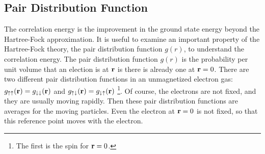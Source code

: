 \subsection{Pair Distribution Function}
The correlation energy is the improvement in the ground state energy beyond the Hartree-Fock approximation.
It is useful to examine an important property of the Hartree-Fock theory, the pair distribution function $g(r)$, to understand the correlation energy.
The pair distribution function $g(r)$ is the probability per unit volume that an election is at $\mathbf{r}$ is there is already one at $\mathbf{r}=0$.
There are two different pair distribution functions in an unmagnetized electron gas: $g_{\uparrow\uparrow}(\mathbf{r}) = g_{\downarrow\downarrow}(\mathbf{r})$ and $g_{\uparrow\downarrow}(\mathbf{r}) = g_{\downarrow\uparrow}(\mathbf{r})$ \footnote{The first is the spin for $\mathbf{r}=0$.}.
Of course, the electrons are not fixed, and they are usually moving rapidly.
Then these pair distribution functions are averages for the moving particles.
Even the electron at $\mathbf{r}=0$ is not fixed, so that this reference point moves with the electron.

